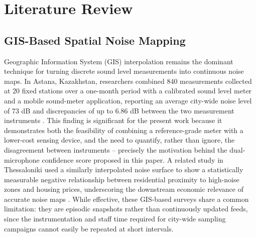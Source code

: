 \documentclass[conference]{IEEEtran}
\begin{document}
\section{Literature Review}

\subsection{GIS-Based Spatial Noise Mapping}
Geographic Information System (GIS) interpolation remains the dominant technique for turning discrete sound level measurements into continuous noise maps. In Astana, Kazakhstan, researchers combined 840 measurements collected at 20 fixed stations over a one-month period with a calibrated sound level meter and a mobile sound-meter application, reporting an average city-wide noise level of 73 dB and discrepancies of up to 6.86 dB between the two measurement instruments \cite{b2}. This finding is significant for the present work because it demonstrates both the feasibility of combining a reference-grade meter with a lower-cost sensing device, and the need to quantify, rather than ignore, the disagreement between instruments -- precisely the motivation behind the dual-microphone confidence score proposed in this paper. A related study in Thessaloniki used a similarly interpolated noise surface to show a statistically measurable negative relationship between residential proximity to high-noise zones and housing prices, underscoring the downstream economic relevance of accurate noise maps \cite{b7}. While effective, these GIS-based surveys share a common limitation: they are episodic snapshots rather than continuously updated feeds, since the instrumentation and staff time required for city-wide sampling campaigns cannot easily be repeated at short intervals.
\end{document}
